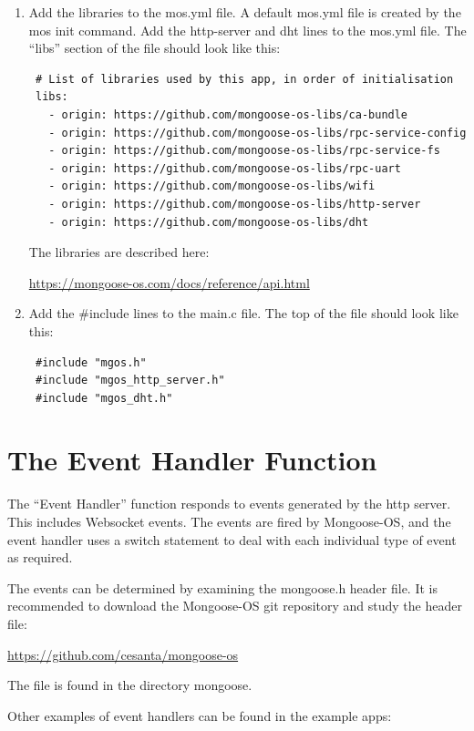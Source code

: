 \documentclass[oneside,letterpaper,12pt]{book}
\begin{document}
\begin{enumerate}
\def\labelenumi{\arabic{enumi}.}
\item
  Add the libraries to the mos.yml file. A default mos.yml file is
  created by the mos init command. Add the http-server and dht lines to
  the mos.yml file. The ``libs'' section of the file should look like
  this:

\begin{verbatim}
 # List of libraries used by this app, in order of initialisation
 libs:
   - origin: https://github.com/mongoose-os-libs/ca-bundle
   - origin: https://github.com/mongoose-os-libs/rpc-service-config
   - origin: https://github.com/mongoose-os-libs/rpc-service-fs
   - origin: https://github.com/mongoose-os-libs/rpc-uart
   - origin: https://github.com/mongoose-os-libs/wifi
   - origin: https://github.com/mongoose-os-libs/http-server
   - origin: https://github.com/mongoose-os-libs/dht
\end{verbatim}

  The libraries are described here:

  \url{https://mongoose-os.com/docs/reference/api.html}
\item
  Add the \#include lines to the main.c file. The top of the file should
  look like this:

\begin{verbatim}
 #include "mgos.h"
 #include "mgos_http_server.h"
 #include "mgos_dht.h"
\end{verbatim}
\end{enumerate}

\section{The Event Handler Function}\label{the-event-handler-function}

The ``Event Handler'' function responds to events generated by the http
server. This includes Websocket events. The events are fired by
Mongoose-OS, and the event handler uses a switch statement to deal with
each individual type of event as required.

The events can be determined by examining the mongoose.h header file. It
is recommended to download the Mongoose-OS git repository and study the
header file:

\url{https://github.com/cesanta/mongoose-os}

The file is found in the directory mongoose.

Other examples of event handlers can be found in the example apps:
\end{document}
